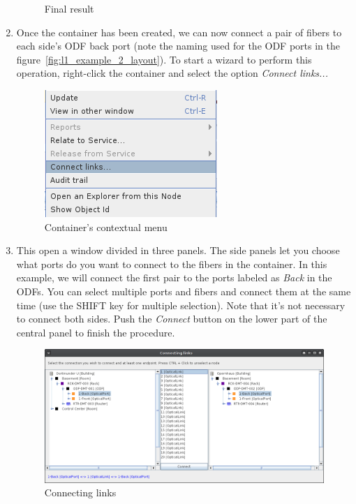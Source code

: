 \documentclass[a4paper]{article}
\begin{document}
\begin{enumerate}
\begin{figure}[h!]
						\caption{Final result}
						\label{fig:l1_example_2_final}
					\end{figure}
					\item Once the container has been created, we can now connect a pair of fibers to each side's ODF back port (note the naming used for the ODF ports in the figure~\ref{fig:l1_example_2_layout}). To start a wizard to perform this operation, right-click the container and select the option \textit{Connect links...}
					\begin{figure}[h!]
						\centering
						\includegraphics[width=0.3\linewidth]{img/l1_example_2_container_context_menu.png}
						\caption{Container's contextual menu}
						\label{fig:l1_example_2_container_context_menu}
					\end{figure}
					\item This open a window divided in three panels. The side panels let you choose what ports do you want to connect to the fibers in the container. In this example, we will connect the first pair to the ports labeled as \textit{Back} in the ODFs. You can select multiple ports and fibers and connect them at the same time (use the SHIFT key for multiple selection). Note that it's not necessary to connect both sides. Push the \textit{Connect} button on the lower part of the central panel to finish the procedure.
					\begin{figure}[h!]
						\centering
						\includegraphics[width=\linewidth]{img/l1_example_2_connect_links.png}
						\caption{Connecting links}
						\label{fig:l1_example_2_connect_links}
					\end{figure}

\end{enumerate}
\end{document}
